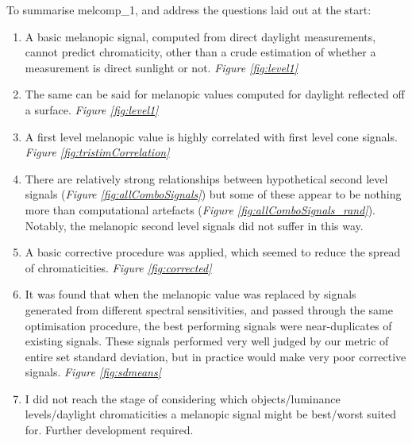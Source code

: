 To summarise melcomp\_1, and address the questions laid out at the start:
\begin{enumerate}
    \item A basic melanopic signal, computed from direct daylight measurements, cannot predict chromaticity, other than a crude estimation of whether a measurement is direct sunlight or not. \emph{Figure \ref{fig:level1}}
    \item The same can be said for melanopic values computed for daylight reflected off a surface. \emph{Figure \ref{fig:level1}}
    \item A first level melanopic value is highly correlated with first level cone signals. \emph{Figure \ref{fig:tristimCorrelation}}
    \item There are relatively strong relationships between hypothetical second level signals (\emph{Figure \ref{fig:allComboSignals}}) but some of these appear to be nothing more than computational artefacts (\emph{Figure \ref{fig:allComboSignals_rand}}). Notably, the melanopic second level signals did not suffer in this way.
    \item A basic corrective procedure was applied, which seemed to reduce the spread of chromaticities. \emph{Figure \ref{fig:corrected}} 
    \item It was found that when the melanopic value was replaced by signals generated from different spectral sensitivities, and passed through the same optimisation procedure, the best performing signals were near-duplicates of existing signals. These signals performed very well judged by our metric of entire set standard deviation, but in practice would make very poor corrective signals. \emph{Figure \ref{fig:sdmeans}}
    \item I did not reach the stage of considering which objects/luminance levels/daylight chromaticities a melanopic signal might be best/worst suited for. Further development required.
\end{enumerate}

